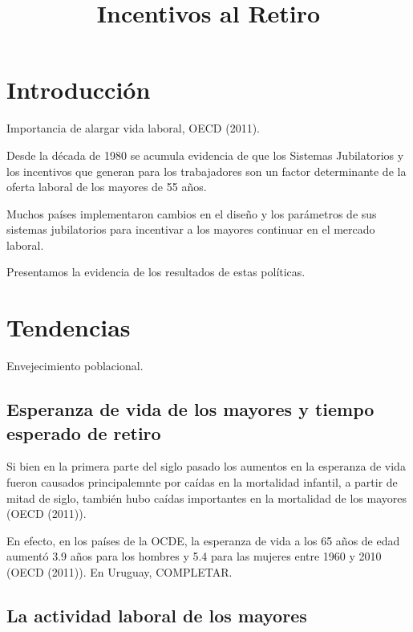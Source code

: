 \documentclass[]{article}
\title{Incentivos al Retiro}
\author{}
\date{\vspace{-2.5em}}
\begin{document}
\maketitle

{
\setcounter{tocdepth}{3}
\tableofcontents
}
\hypertarget{introducciuxf3n}{%
\section{Introducción}\label{introducciuxf3n}}

Importancia de alargar vida laboral, OECD (2011).

Desde la década de 1980 se acumula evidencia de que los Sistemas
Jubilatorios y los incentivos que generan para los trabajadores son un
factor determinante de la oferta laboral de los mayores de 55 años.

Muchos países implementaron cambios en el diseño y los parámetros de sus
sistemas jubilatorios para incentivar a los mayores continuar en el
mercado laboral.

Presentamos la evidencia de los resultados de estas políticas.

\hypertarget{tendencias}{%
\section{Tendencias}\label{tendencias}}

Envejecimiento poblacional.

\hypertarget{esperanza-de-vida-de-los-mayores-y-tiempo-esperado-de-retiro}{%
\subsection{Esperanza de vida de los mayores y tiempo esperado de
retiro}\label{esperanza-de-vida-de-los-mayores-y-tiempo-esperado-de-retiro}}

Si bien en la primera parte del siglo pasado los aumentos en la
esperanza de vida fueron causados principalemnte por caídas en la
mortalidad infantil, a partir de mitad de siglo, también hubo caídas
importantes en la mortalidad de los mayores (OECD (2011)).

En efecto, en los países de la OCDE, la esperanza de vida a los 65 años
de edad aumentó 3.9 años para los hombres y 5.4 para las mujeres entre
1960 y 2010 (OECD (2011)). En Uruguay, COMPLETAR.

\hypertarget{la-actividad-laboral-de-los-mayores}{%
\subsection{La actividad laboral de los
mayores}\label{la-actividad-laboral-de-los-mayores}}
\end{document}
